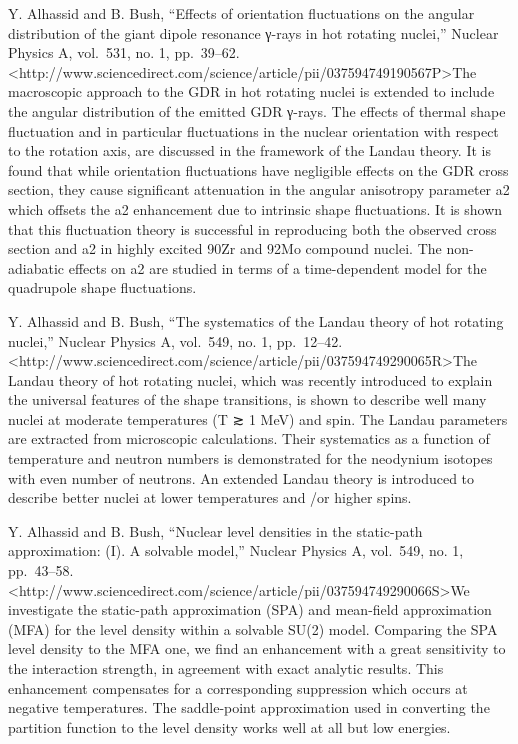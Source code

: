 \documentclass[]{article}
\begin{document}
Y. Alhassid and B. Bush, ``Effects of orientation fluctuations on the
angular distribution of the giant dipole resonance γ-rays in hot
rotating nuclei,'' Nuclear Physics A, vol.~531, no. 1, pp.~39--62.
\textless{}http://www.sciencedirect.com/science/article/pii/037594749190567P\textgreater{}The
macroscopic approach to the GDR in hot rotating nuclei is extended to
include the angular distribution of the emitted GDR γ-rays. The effects
of thermal shape fluctuation and in particular fluctuations in the
nuclear orientation with respect to the rotation axis, are discussed in
the framework of the Landau theory. It is found that while orientation
fluctuations have negligible effects on the GDR cross section, they
cause significant attenuation in the angular anisotropy parameter a2
which offsets the a2 enhancement due to intrinsic shape fluctuations. It
is shown that this fluctuation theory is successful in reproducing both
the observed cross section and a2 in highly excited 90Zr and 92Mo
compound nuclei. The non-adiabatic effects on a2 are studied in terms of
a time-dependent model for the quadrupole shape fluctuations.

Y. Alhassid and B. Bush, ``The systematics of the Landau theory of hot
rotating nuclei,'' Nuclear Physics A, vol.~549, no. 1, pp.~12--42.
\textless{}http://www.sciencedirect.com/science/article/pii/037594749290065R\textgreater{}The
Landau theory of hot rotating nuclei, which was recently introduced to
explain the universal features of the shape transitions, is shown to
describe well many nuclei at moderate temperatures (T ≳ 1 MeV) and spin.
The Landau parameters are extracted from microscopic calculations. Their
systematics as a function of temperature and neutron numbers is
demonstrated for the neodynium isotopes with even number of neutrons. An
extended Landau theory is introduced to describe better nuclei at lower
temperatures and /or higher spins.

Y. Alhassid and B. Bush, ``Nuclear level densities in the static-path
approximation: (I). A solvable model,'' Nuclear Physics A, vol.~549, no.
1, pp.~43--58.
\textless{}http://www.sciencedirect.com/science/article/pii/037594749290066S\textgreater{}We
investigate the static-path approximation (SPA) and mean-field
approximation (MFA) for the level density within a solvable SU(2) model.
Comparing the SPA level density to the MFA one, we find an enhancement
with a great sensitivity to the interaction strength, in agreement with
exact analytic results. This enhancement compensates for a corresponding
suppression which occurs at negative temperatures. The saddle-point
approximation used in converting the partition function to the level
density works well at all but low energies.
\end{document}
